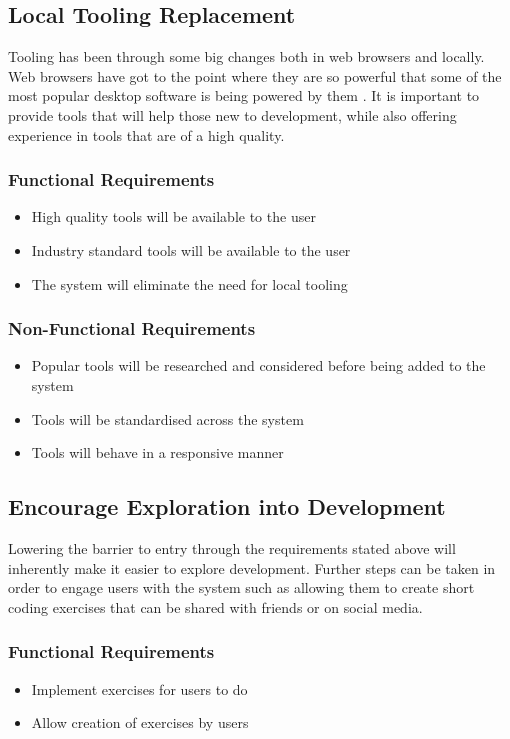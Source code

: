 \subsection{Local Tooling Replacement}
Tooling has been through some big changes both in web browsers and locally. Web browsers have got to the point where they are so powerful that some of the most popular desktop software is being powered by them \cite{carlo}. It is important to provide tools that will help those new to development, while also offering experience in tools that are of a high quality.

\subsubsection{Functional Requirements}
\begin{itemize}
    \setlength{\itemsep}{0em}
    \item High quality tools will be available to the user
    \item Industry standard tools will be available to the user
    \item The system will eliminate the need for local tooling
\end{itemize}
\subsubsection{Non-Functional Requirements}
\begin{itemize}
    \setlength{\itemsep}{0em}
    \item Popular tools will be researched and considered before being added to the system
    \item Tools will be standardised across the system
    \item Tools will behave in a responsive manner
\end{itemize}

\subsection{Encourage Exploration into Development}
Lowering the barrier to entry through the requirements stated above will inherently make it easier to explore development. Further steps can be taken in order to engage users with the system such as allowing them to create short coding exercises that can be shared with friends or on social media.

\subsubsection{Functional Requirements}
\begin{itemize}
    \setlength{\itemsep}{0em}
    \item Implement exercises for users to do
    \item Allow creation of exercises by users
\end{itemize}
